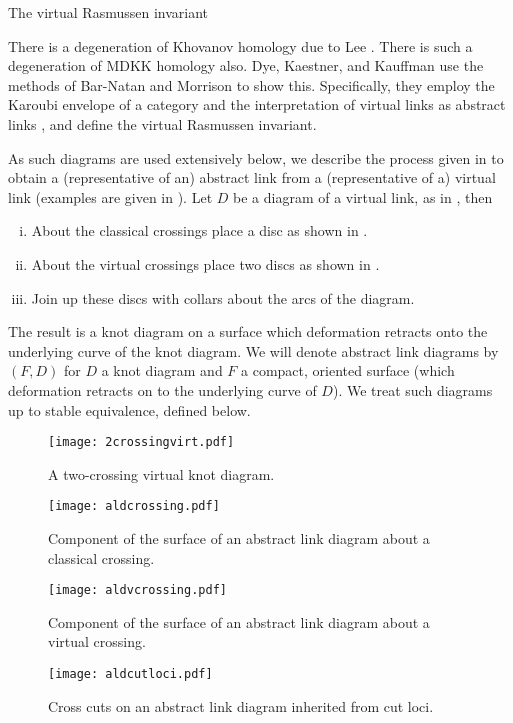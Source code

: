 \documentclass[10pt,oneside]{amsart}
\theoremstyle{definition}
\numberwithin{equation}{section}
\begin{document}
{		{\normalfont\bfseries}}{The virtual Rasmussen invariant}
\label{Sec:lee}

There is a degeneration of Khovanov homology due to Lee \cite{Lee2005}. There is such a degeneration of MDKK homology also. Dye, Kaestner, and Kauffman use the methods of Bar-Natan and Morrison \cite{Bar-Natan2006} to show this. Specifically, they employ the Karoubi envelope of a category and the interpretation of virtual links as abstract links \cite{Carter2000, Kamada2000}, and define the virtual Rasmussen invariant.

As such diagrams are used extensively below, we describe the process given in \cite{Kamada2000} to obtain a (representative of an) abstract link from a (representative of a) virtual link (examples are given in  ). Let \( D \) be a diagram of a virtual link, as in , then
\begin{enumerate}[(i)]
	\item About the classical crossings place a disc as shown in  .
	\item About the virtual crossings place two discs as shown in .
	\item Join up these discs with collars about the arcs of the diagram.
\end{enumerate}
The result is a knot diagram on a surface which deformation retracts onto the underlying curve of the knot diagram. We will denote abstract link diagrams by \( \left( F, D\right) \) for \( D \) a knot diagram and \( F \) a compact, oriented surface (which deformation retracts on to the underlying curve of \( D \)). We treat such diagrams up to stable equivalence, defined below.

\begin{figure}
	\texttt{[image: 2crossingvirt.pdf]}
	\caption{A two-crossing virtual knot diagram.}
	\label{Fig:vknot}
\end{figure}
\begin{figure}
	\texttt{[image: aldcrossing.pdf]}
	\caption{Component of the surface of an abstract link diagram about a classical crossing.}
	\label{Fig:ASDCrossing}
\end{figure}
\begin{figure}
	\texttt{[image: aldvcrossing.pdf]}
	\caption{Component of the surface of an abstract link diagram about a virtual crossing.}
	\label{Fig:ASDVirtual}
\end{figure}
\begin{figure}
	\texttt{[image: aldcutloci.pdf]}
	\caption{Cross cuts on an abstract link diagram inherited from cut loci.}
	\label{Fig:ALDCutLoci}
\end{figure}
\end{document}
